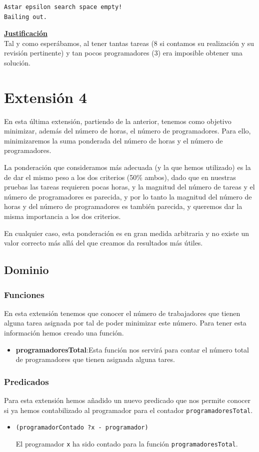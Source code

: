 \documentclass[11pt]{article}
\begin{document}
\begin{verbatim}
Astar epsilon search space empty!
Bailing out.
\end{verbatim}
\noindent \underline{\textbf{Justificación}}\\

Tal y como esperábamos, al tener tantas tareas (8 si contamos su realización y su revisión pertinente) y tan pocos programadores (3) era imposible obtener una solución. 
\medskip

\newpage

\section{Extensión 4}

En esta última extensión, partiendo de la anterior, tenemos como objetivo minimizar, además del número de horas, el número de programadores. Para ello, minimizaremos la suma ponderada del número de horas y el número de programadores.

La ponderación que consideramos más adecuada (y la que hemos utilizado) es la de dar el mismo peso a los dos criterios (50\% ambos), dado que en nuestras pruebas las tareas requieren pocas horas, y la magnitud del número de tareas y el número de programadores es parecida, y por lo tanto la magnitud del número de horas y del número de programadores es también parecida, y queremos dar la misma importancia a los dos criterios.

En cualquier caso, esta ponderación es en gran medida arbitraria y no existe un valor correcto más allá del que creamos da resultados más útiles.

\subsection{Dominio}
\subsubsection{Funciones}
En esta extensión tenemos que conocer el número de trabajadores que tienen alguna tarea asignada por tal de poder minimizar este número. Para tener esta información hemos creado una función.
\begin{itemize}
	\item \textbf{programadoresTotal}:Esta función nos servirá para contar el número total de programadores que tienen asignada alguna tares.  
\end{itemize}
\subsubsection{Predicados}
Para esta extensión hemos añadido un nuevo predicado que nos permite conocer si ya hemos contabilizado al programador para el contador \texttt{programadoresTotal}.
\begin{itemize}
  \item \verb|(programadorContado ?x - programador)|
  
  El programador \texttt{x} ha sido contado para la función \texttt{programadoresTotal}.
\end{itemize}
\end{document}
